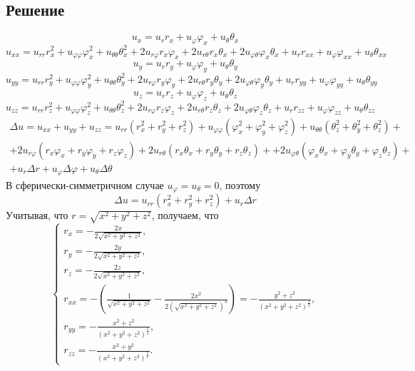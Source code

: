 \documentclass[11pt]{article}
\newcounter{th}\setcounter{th}{0}
\begin{document}
\subsection{Решение}
\label{sec:orgcec81ea}
$$u_x = u_rr_x + u_{\varphi}\varphi_x + u_{\theta}\theta_x$$
\begin{equation*}
u_{xx} = u_{rr}r_x^2 + u_{\varphi\varphi}\varphi_x^2 + u_{\theta\theta}\theta_x^2 +
2u_{r\varphi}r_x\varphi_x + 2u_{r\theta}r_x\theta_x + 2u_{\varphi\theta}\varphi_x\theta_x +
u_rr_{xx} + u_{\varphi}\varphi_{xx} + u_{\theta}\theta_{xx}
\end{equation*}
$$u_y = u_rr_y + u_{\varphi}\varphi_y + u_{\theta}\theta_y$$
\begin{equation*}
u_{yy} = u_{rr}r_y^2 + u_{\varphi\varphi}\varphi_y^2 + u_{\theta\theta}\theta_y^2 +
2u_{r\varphi}r_y\varphi_y + 2u_{r\theta}r_y\theta_y + 2u_{\varphi\theta}\varphi_y\theta_y +
u_rr_{yy} + u_{\varphi}\varphi_{yy} + u_{\theta}\theta_{yy}
\end{equation*}
$$u_z = u_rr_z + u_{\varphi}\varphi_z + u_{\theta}\theta_z$$
\begin{equation*}
u_{zz} = u_{rr}r_z^2 + u_{\varphi\varphi}\varphi_z^2 + u_{\theta\theta}\theta_z^2 +
2u_{r\varphi}r_z\varphi_z + 2u_{r\theta}r_z\theta_z + 2u_{\varphi\theta}\varphi_z\theta_z +
u_rr_{zz} + u_{\varphi}\varphi_{zz} + u_{\theta}\theta_{zz}
\end{equation*}
\begin{multline}
\Delta u = u_{xx} + u_{yy} + u_{zz} = u_{rr}(r_x^2 + r_y^2 + r_z^2)
+ u_{\varphi\varphi}(\varphi_x^2 + \varphi_y^2 + \varphi_z^2)
+ u_{\theta\theta}(\theta_z^2 + \theta_y^2 + \theta_z^2) + \\
+ 2u_{r\varphi}(r_x\varphi_x + r_y\varphi_y + r_z\varphi_z)
+ 2u_{r\theta}(r_x\theta_x + r_y\theta_y + r_z\theta_z) +
+ 2u_{\varphi\theta}(\varphi_x\theta_x + \varphi_y\theta_y + \varphi_z\theta_z) + \\
+ u_r\Delta r + u_{\varphi}\Delta\varphi + u_{\theta}\Delta\theta
\end{multline}
В сферически-симметричном случае $u_{\varphi} = u_{\theta} = 0$, поэтому
\begin{equation}
\Delta u = u_{rr}(r_x^2 + r_y^2 + r_z^2) + u_r\Delta r
\end{equation}
Учитывая, что $r = \sqrt{x^2 + y^2 + z^2}$, получаем, что
\begin{equation}
\begin{cases}
r_x = -\frac{2x}{2\sqrt{x^2 + y^2 + z^2}}, \\
r_y = -\frac{2y}{2\sqrt{x^2 + y^2 + z^2}}, \\
r_z = -\frac{2z}{2\sqrt{x^2 + y^2 + z^2}}, \\
r_{xx} = -\left(\frac1{\sqrt{x^2 + y^2 + z^2}} - \frac{2x^2}{2(\sqrt{x^2 + y^2 + z^2})^3}\right) =
-\frac{y^2 + z^2}{(x^2 + y^2 + z^2)^{\frac32}}, \\
r_{yy} = -\frac{x^2 + z^2}{(x^2 + y^2 + z^2)^{\frac32}}, \\
r_{zz} = -\frac{x^2 + y^2}{(x^2 + y^2 + z^2)^{\frac32}}.
\end{cases}
\end{equation}
\end{document}
